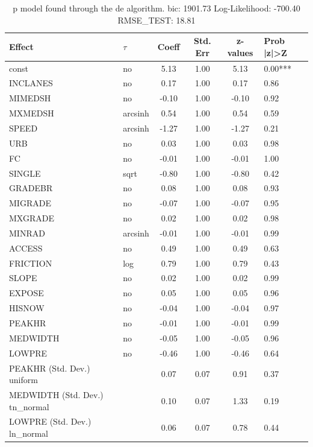 \begin{table}
	\caption{p model found through the de algorithm. bic: 1901.73 Log-Likelihood: -700.40 RMSE_TEST: 18.81}
	\begin{center}
		\begin{tabular}{|l|l|c|c|c|l|}
			\hline
			Effect & $\tau$ & Coeff & Std. Err & z-values & Prob |z|>Z \\
			\hline
			const & no & 5.13 & 1.00 & 5.13 & 0.00*** \\
			\hline
			INCLANES & no & 0.17 & 1.00 & 0.17 & 0.86 \\
			\hline
			MIMEDSH & no & -0.10 & 1.00 & -0.10 & 0.92 \\
			\hline
			MXMEDSH & arcsinh & 0.54 & 1.00 & 0.54 & 0.59 \\
			\hline
			SPEED & arcsinh & -1.27 & 1.00 & -1.27 & 0.21 \\
			\hline
			URB & no & 0.03 & 1.00 & 0.03 & 0.98 \\
			\hline
			FC & no & -0.01 & 1.00 & -0.01 & 1.00 \\
			\hline
			SINGLE & sqrt & -0.80 & 1.00 & -0.80 & 0.42 \\
			\hline
			GRADEBR & no & 0.08 & 1.00 & 0.08 & 0.93 \\
			\hline
			MIGRADE & no & -0.07 & 1.00 & -0.07 & 0.95 \\
			\hline
			MXGRADE & no & 0.02 & 1.00 & 0.02 & 0.98 \\
			\hline
			MINRAD & arcsinh & -0.01 & 1.00 & -0.01 & 0.99 \\
			\hline
			ACCESS & no & 0.49 & 1.00 & 0.49 & 0.63 \\
			\hline
			FRICTION & log & 0.79 & 1.00 & 0.79 & 0.43 \\
			\hline
			SLOPE & no & 0.02 & 1.00 & 0.02 & 0.99 \\
			\hline
			EXPOSE & no & 0.05 & 1.00 & 0.05 & 0.96 \\
			\hline
			HISNOW & no & -0.04 & 1.00 & -0.04 & 0.97 \\
			\hline
			PEAKHR & no & -0.01 & 1.00 & -0.01 & 0.99 \\
			\hline
			MEDWIDTH & no & -0.05 & 1.00 & -0.05 & 0.96 \\
			\hline
			LOWPRE & no & -0.46 & 1.00 & -0.46 & 0.64 \\
			\hline
			PEAKHR (Std. Dev.) uniform &  & 0.07 & 0.07 & 0.91 & 0.37 \\
			\hline
			MEDWIDTH (Std. Dev.) tn_normal &  & 0.10 & 0.07 & 1.33 & 0.19 \\
			\hline
			LOWPRE (Std. Dev.) ln_normal &  & 0.06 & 0.07 & 0.78 & 0.44 \\
			\hline
		\end{tabular}
	\end{center}
\end{table}